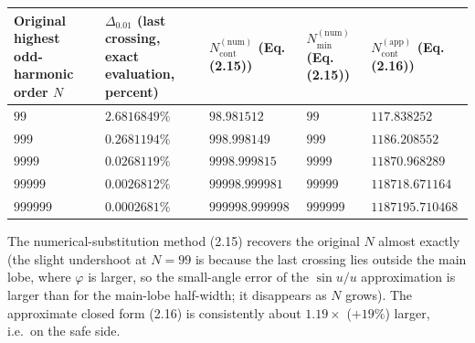 \documentclass[
]{ltjsarticle}
\newcounter{none} %
\begin{document}
{\def\LTcaptype{none} %
\begin{longtable}[]{@{}
  >{\raggedleft\arraybackslash}p{}
  >{\raggedleft\arraybackslash}p{}
  >{\raggedleft\arraybackslash}p{}
  >{\raggedleft\arraybackslash}p{}
  >{\raggedleft\arraybackslash}p{}@{}}
\toprule\noalign{}
\begin{minipage}[b]{\linewidth}\raggedleft
Original highest odd-harmonic order \(N\)
\end{minipage} & \begin{minipage}[b]{\linewidth}\raggedleft
\(\Delta_{0.01}\) (last crossing, exact evaluation, percent)
\end{minipage} & \begin{minipage}[b]{\linewidth}\raggedleft
\(N_{\mathrm{cont}}^{(\mathrm{num})}\) (Eq. (2.15))
\end{minipage} & \begin{minipage}[b]{\linewidth}\raggedleft
\(N_{\min}^{(\mathrm{num})}\) (Eq. (2.15))
\end{minipage} & \begin{minipage}[b]{\linewidth}\raggedleft
\(N_{\mathrm{cont}}^{(\mathrm{app})}\) (Eq. (2.16))
\end{minipage} \\
\midrule\noalign{}
\endhead
\bottomrule\noalign{}
\endlastfoot
\(99\) & \(2.6816849\%\) & \(98.981512\) & \(99\) & \(117.838252\) \\
\(999\) & \(0.2681194\%\) & \(998.998149\) & \(999\) &
\(1186.208552\) \\
\(9999\) & \(0.0268119\%\) & \(9998.999815\) & \(9999\) &
\(11870.968289\) \\
\(99999\) & \(0.0026812\%\) & \(99998.999981\) & \(99999\) &
\(118718.671164\) \\
\(999999\) & \(0.0002681\%\) & \(999998.999998\) & \(999999\) &
\(1187195.710468\) \\
\end{longtable}
}

The numerical-substitution method (2.15) recovers the original \(N\)
almost exactly (the slight undershoot at \(N=99\) is because the last
crossing lies outside the main lobe, where \(\varphi\) is larger, so the
small-angle error of the \(\sin u/u\) approximation is larger than for
the main-lobe half-width; it disappears as \(N\) grows). The approximate
closed form (2.16) is consistently about \(1.19\times\) (\(+19\%\))
larger, i.e.~on the safe side.
\end{document}
